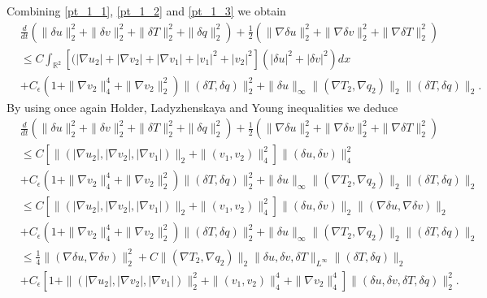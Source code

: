 \documentclass[11pt, a4paper, article,reqno,]{amsart}
\theoremstyle{remark}
\numberwithin{equation}{section}
\begin{document}
Combining \eqref{pt_1_1}, \eqref{pt_1_2} and \eqref{pt_1_3} we obtain
\begin{equation*}
    \begin{aligned}
        & \frac{d}{dt} \left( \|\delta u\|_2^2 + \|\delta v\|_2^2 + \|\delta T\|_2^2 + \|\delta q\|_2^2 \right) + \frac{1}{2} (\|\nabla \delta u\|_2^2 + \|\nabla \delta v\|_2^2 + \|\nabla \delta T\|_2^2) \\
        & \leq C \int_{\mathbb{R}^2}[(|\nabla u_2|+ |\nabla v_2| + |\nabla v_1| + |v_1|^2 + |v_2|^2] (|\delta u|^2 + |\delta v|^2)  dx \\
       &+ C_\epsilon(1 + \|\nabla v_2\|_4^4 + \|\nabla v_2\|_2^2)\|(\delta T,\delta q)\|_2^2 + \|\delta u\|_\infty \|(\nabla T_2, \nabla q_2)\|_2\|(\delta T,\delta q)\|_2.
    \end{aligned}
\end{equation*}
By using once again Holder, Ladyzhenskaya and Young inequalities we deduce
\begin{equation*}
    \begin{aligned}
        & \frac{d}{dt} \left( \|\delta u\|_2^2 + \|\delta v\|_2^2 + \|\delta T\|_2^2 + \|\delta q\|_2^2 \right) + \frac{1}{2} (\|\nabla \delta u\|_2^2 + \|\nabla \delta v\|_2^2 + \|\nabla \delta T\|_2^2) \\
        & \leq C \left[\|(|\nabla u_2|, |\nabla v_2|,|\nabla v_1|)\|_2  + \|(v_1,v_2)\|_4^2 \right]\|(\delta u, \delta v)\|_4^2 \\
        &+ C_\epsilon(1 + \|\nabla v_2\|_4^4 + \|\nabla v_2\|_2^2)\|(\delta T,\delta q)\|_2^2 + \|\delta u\|_\infty \|(\nabla T_2, \nabla q_2)\|_2\|(\delta T,\delta q)\|_2\\
        & \leq C \left[\|(|\nabla u_2|, |\nabla v_2|,|\nabla v_1|)\|_2  + \|(v_1,v_2)\|_4^2 \right] \|(\delta u, \delta v)\|_2 \|(\nabla \delta u, \nabla \delta v)\|_2  \\
        &+ C_\epsilon(1 + \|\nabla v_2\|_4^4 + \|\nabla v_2\|_2^2)\|(\delta T,\delta q)\|_2^2+ \|\delta u\|_\infty \|(\nabla T_2, \nabla q_2)\|_2\|(\delta T,\delta q)\|_2 \\
        & \leq \frac{1}{4}\|(\nabla \delta u, \nabla \delta v)\|_2^2 + C \|(\nabla T_{2}, \nabla q_2)\|_2 \|\delta u, \delta v, \delta T \|_{L^{\infty}} \|(\delta T,\delta q)\|_2 \\
        & + C_\epsilon \left[ 1+ \|(|\nabla u_2|, |\nabla v_2|,|\nabla v_1|)\|_2^2 +  \|(v_1,v_2)\|_4^4 + \|\nabla v_2\|_4^4 \right] \|(\delta u, \delta v, \delta T,\delta q)\|_2^2.
    \end{aligned}
\end{equation*}
\end{document}
